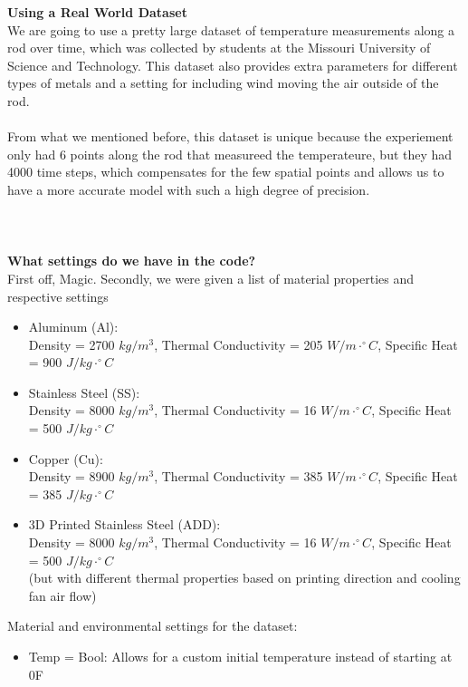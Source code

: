 \documentclass[11pt]{article}
\begin{document}
\begin{onehalfspace}
    \noindent
    \textbf{Using a Real World Dataset} \\
    We are going to use a pretty large dataset of temperature measurements along a rod over time, which was collected by students at the Missouri University of Science and Technology.
    This dataset also provides extra parameters for different types of metals and a setting for including wind moving the air outside of the rod. 
    \\\\
    \noindent
    From what we mentioned before, this dataset is unique because the experiement only had 6 points along the rod that measureed the temperateure, but they had 4000 time steps, 
    which compensates for the few spatial points and allows us to have a more accurate model with such a high degree of precision. \\
    \\\\\\
    \noindent
    \textbf{What settings do we have in the code?} \\
    First off, Magic. Secondly, we were given a list of material properties and respective settings
    \begin{itemize}
        \item Aluminum (Al): \\ Density = 2700 $kg/m^3$, Thermal Conductivity = 205 $W/m\cdot^\circ C$, Specific Heat = 900 $J/kg\cdot^\circ C$
        \item Stainless Steel (SS): \\ Density = 8000 $kg/m^3$, Thermal Conductivity = 16 $W/m\cdot^\circ C$, Specific Heat = 500 $J/kg\cdot^\circ C$
        \item Copper (Cu): \\ Density = 8900 $kg/m^3$, Thermal Conductivity = 385 $W/m\cdot^\circ C$, Specific Heat = 385 $J/kg\cdot^\circ C$
        \item 3D Printed Stainless Steel (ADD): \\ Density = 8000 $kg/m^3$, Thermal Conductivity = 16 $W/m\cdot^\circ C$, Specific Heat = 500 $J/kg\cdot^\circ C$ \\ (but with different thermal properties based on printing direction and cooling fan air flow)
    \end{itemize}
    \noindent
    Material and environmental settings for the dataset:
    \begin{itemize}
        \item Temp = Bool: Allows for a custom initial temperature instead of starting at 0F

\end{itemize}
\end{onehalfspace}
\end{document}
